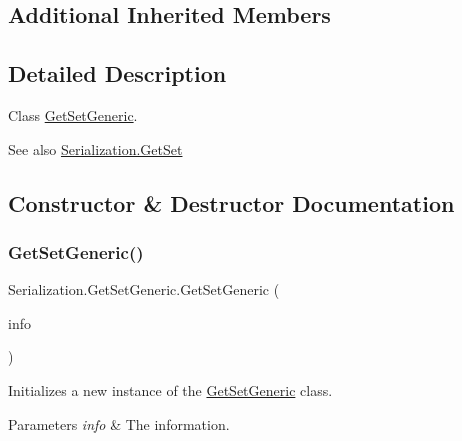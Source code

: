 \subsection*{Additional Inherited Members}


\subsection{Detailed Description}
Class \hyperlink{class_serialization_1_1_get_set_generic}{Get\+Set\+Generic}. 

\begin{DoxySeeAlso}{See also}
\hyperlink{class_serialization_1_1_get_set}{Serialization.\+Get\+Set}


\end{DoxySeeAlso}


\subsection{Constructor \& Destructor Documentation}
\mbox{\label{class_serialization_1_1_get_set_generic_a4e6eed71f2c2d5ae431263da5dcd5a68}} 
\subsubsection{\texorpdfstring{Get\+Set\+Generic()}{GetSetGeneric()}\hspace{0.1cm}{\footnotesize\ttfamily [1/3]}}
{\footnotesize\ttfamily Serialization.\+Get\+Set\+Generic.\+Get\+Set\+Generic (\begin{DoxyParamCaption}\item[{Property\+Info}]{info }\end{DoxyParamCaption})\hspace{0.3cm}{\ttfamily [inline]}}



Initializes a new instance of the \hyperlink{class_serialization_1_1_get_set_generic}{Get\+Set\+Generic} class. 


\begin{DoxyParams}{Parameters}
{\em info} & The information.\\
\hline
\end{DoxyParams}
\mbox{\label{class_serialization_1_1_get_set_generic_a03e2851564f498ef4eb251f31ddd1dcb}} 
